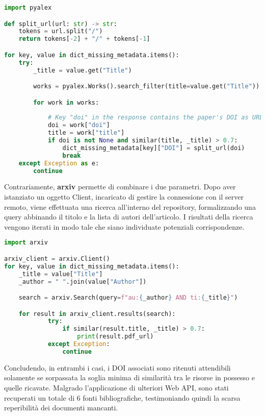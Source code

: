 \begin{lstlisting}[language=python, caption=Recupero di riferimenti bibliografici tramite OpenAlex]
import pyalex

def split_url(url: str) -> str:
    tokens = url.split("/")
    return tokens[-2] + "/" + tokens[-1]

for key, value in dict_missing_metadata.items():
    try:
        _title = value.get("Title")

        works = pyalex.Works().search_filter(title=value.get("Title")).get()

        for work in works:
        
            # Key "doi" in the response contains the paper's DOI as URL
            doi = work["doi"]
            title = work["title"]
            if doi is not None and similar(title, _title) > 0.7:
                dict_missing_metadata[key]["DOI"] = split_url(doi)
                break
    except Exception as e:
        continue
\end{lstlisting}
Contrariamente, \textbf{arxiv} permette di combinare i due parametri. Dopo aver istanziato un oggetto Client, incaricato di gestire la connessione con il server remoto, viene effettuata una ricerca all'interno del repository, formalizzando una query abbinando il titolo e la lista di autori dell'articolo. I risultati della ricerca vengono iterati in modo tale che siano individuate potenziali corrispondenze.
\begin{lstlisting}[language=python, caption=Recupero di riferimenti bibliografici tramite arXiv]
import arxiv

arxiv_client = arxiv.Client()
for key, value in dict_missing_metadata.items():
    _title = value["Title"]
    _author = " ".join(value["Author"])

    search = arxiv.Search(query=f"au:{_author} AND ti:{_title}")

    for result in arxiv_client.results(search):
            try:
                if similar(result.title, _title) > 0.7:  
                    print(result.pdf_url) 
            except Exception:
                continue
\end{lstlisting}
Concludendo, in entrambi i casi, i DOI associati sono ritenuti attendibili solamente se sorpassata la soglia minima di similarità tra le risorse in possesso e quelle ricavate. Malgrado l'applicazione di ulteriori Web API, sono stati recuperati un totale di $6$ fonti bibliografiche, testimoniando quindi la scarsa reperibilità dei documenti mancanti.